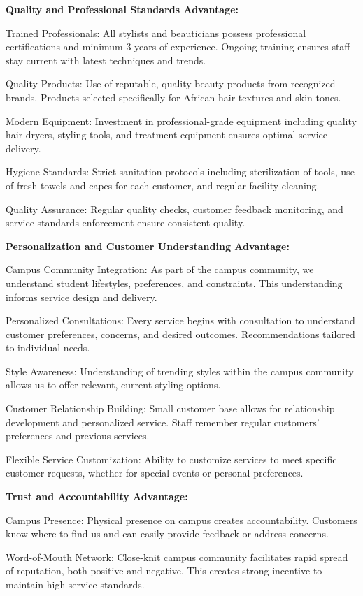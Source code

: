 \textbf{Quality and Professional Standards Advantage:}

Trained Professionals: All stylists and beauticians possess professional certifications and minimum 3 years of experience. Ongoing training ensures staff stay current with latest techniques and trends.

Quality Products: Use of reputable, quality beauty products from recognized brands. Products selected specifically for African hair textures and skin tones.

Modern Equipment: Investment in professional-grade equipment including quality hair dryers, styling tools, and treatment equipment ensures optimal service delivery.

Hygiene Standards: Strict sanitation protocols including sterilization of tools, use of fresh towels and capes for each customer, and regular facility cleaning.

Quality Assurance: Regular quality checks, customer feedback monitoring, and service standards enforcement ensure consistent quality.

\textbf{Personalization and Customer Understanding Advantage:}

Campus Community Integration: As part of the campus community, we understand student lifestyles, preferences, and constraints. This understanding informs service design and delivery.

Personalized Consultations: Every service begins with consultation to understand customer preferences, concerns, and desired outcomes. Recommendations tailored to individual needs.

Style Awareness: Understanding of trending styles within the campus community allows us to offer relevant, current styling options.

Customer Relationship Building: Small customer base allows for relationship development and personalized service. Staff remember regular customers' preferences and previous services.

Flexible Service Customization: Ability to customize services to meet specific customer requests, whether for special events or personal preferences.

\textbf{Trust and Accountability Advantage:}

Campus Presence: Physical presence on campus creates accountability. Customers know where to find us and can easily provide feedback or address concerns.

Word-of-Mouth Network: Close-knit campus community facilitates rapid spread of reputation, both positive and negative. This creates strong incentive to maintain high service standards.

